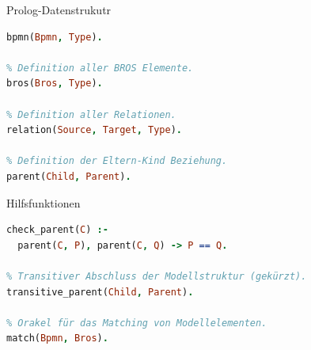 \begin{frame}[fragile]{Prolog-Datenstrukutr}
\begin{lstlisting}[language=Prolog]
% Definition aller BPMN Elemente.
bpmn(Bpmn, Type).

% Definition aller BROS Elemente.
bros(Bros, Type).

% Definition aller Relationen.
relation(Source, Target, Type).

% Definition der Eltern-Kind Beziehung.
parent(Child, Parent).
\end{lstlisting}
\end{frame}
\begin{frame}[fragile]{Hilfsfunktionen}
\begin{lstlisting}[language=Prolog]
% Konsistenz der Eltern-Kind Beziehung.
check_parent(C) :- 
  parent(C, P), parent(C, Q) -> P == Q.

% Transitiver Abschluss der Modellstruktur (gekürzt).
transitive_parent(Child, Parent).

% Orakel für das Matching von Modellelementen.
match(Bpmn, Bros).
\end{lstlisting}
\end{frame}

